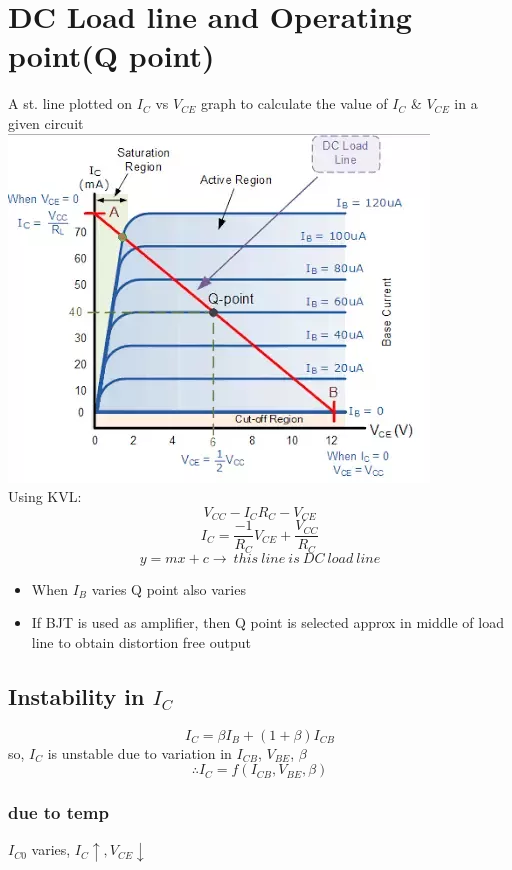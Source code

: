 \documentclass[10pt, a4paper]{report}
\begin{document}
	\section{DC Load line and Operating point(Q point)}
	A st. line plotted on $ I_C $ vs $ V_{CE} $ graph to calculate the value of $ I_C $ \& $ V_{CE} $ in a given circuit\\
	\includegraphics[width=\linewidth]{img/dc load line}\\
	Using KVL:
	$$ V_{CC} - I_CR_C - V_{CE} $$
	$$ I_C = \dfrac{-1}{R_C} V_{CE} + \dfrac{V_{CC}}{R_C} $$
	$$ y = mx + c \rightarrow\ this\ line\ is\ DC\ load\ line $$
	\begin{itemize}
		\item When $ I_B $ varies Q point also varies
		\item If BJT is used as amplifier, then Q point is selected approx in middle of load line to obtain distortion free output
	\end{itemize}
	\subsection{Instability in $ I_C $}
	$$ I_C = \beta I_B + (1+\beta) I_{CB} $$
	so, $ I_C $ is unstable due to variation in $ I_{CB} $, $ V_{BE} $, $\beta$\\
	$$ \therefore I_C = f(I_{CB}, V_{BE}, \beta) $$
	\subsubsection{due to temp}
	$ I_{C0} $ varies, $ I_C\uparrow, V_{CE} \downarrow $
\end{document}
